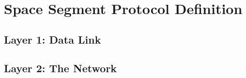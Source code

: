 \section{Space Segment Protocol Definition}
\subsection{Layer 1: Data Link}


\subsection{Layer 2: The Network}

%